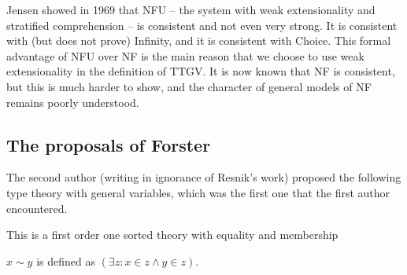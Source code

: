 \documentclass[12pt]{article}
\begin{document}
Jensen showed in 1969 that NFU -- the system with weak extensionality and stratified comprehension -- is consistent and not even very strong.  It is consistent with (but does not prove) Infinity, and it is consistent with Choice.  This formal advantage of NFU over NF is the main reason that we choose to use weak extensionality in the definition of TTGV.  It is now known that NF is consistent, but this is much harder to show, and the character of general models of NF remains poorly understood.



\subsection{The proposals of Forster}

The second author  (writing in ignorance of Resnik's work) proposed the following type theory with general variables, which was the first one that the first author encountered. 

This is a first order one sorted theory with equality and membership



\begin{dfn} $x \sim y$ is defined as $(\exists z:x \in z \wedge y \in z)$.\end{dfn}
\end{document}
